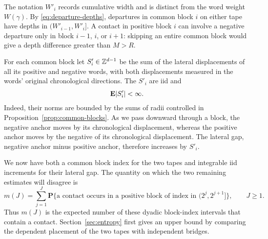 The notation $W'_i$ records cumulative width and is distinct from the
word weight $W(\gamma)$. By \eqref{eq:departure-depths}, departures in
common block $i$ on either tape have depths in
$(W'_{i-1},W'_i]$. A contact in positive block $i$ can involve a negative
departure only in block $i-1$, $i$, or $i+1$: skipping an entire common
block would give a depth difference greater than $M>R$.

For each common block let $S'_i\in\mathbb Z^{d-1}$ be the sum of the lateral
displacements of all its positive and negative words, with both
displacements measured in the words' original chronological directions.
The $S'_i$ are iid and
\begin{equation}
                    \mathbf E\lvert S'_i\rvert<\infty.
 \label{eq:lateral-moment}
\end{equation}
Indeed, their norms are bounded by the sums of radii controlled in
Proposition~\ref{prop:common-blocks}. As we pass downward through a
block, the negative anchor moves by its chronological displacement,
whereas the positive anchor moves by the negative of its chronological
displacement. The lateral gap, negative anchor minus positive anchor,
therefore increases by $S'_i$.

We now have both a common block index for the two tapes and integrable
iid increments for their lateral gap. The quantity on which the two
remaining estimates will disagree is
\begin{equation}
 m(J)=\sum_{j=1}^J\mathbf P\bigl\{
  \text{a contact occurs in a positive block of index in }
                      (2^j,2^{j+1}]\bigr\},\qquad J\ge1.
 \label{eq:contact-count}
\end{equation}
Thus $m(J)$ is the expected number of these dyadic block-index intervals
that contain a contact. Section~\ref{sec:entropy} first gives an upper
bound by comparing the dependent placement of the two tapes with
independent bridges.
